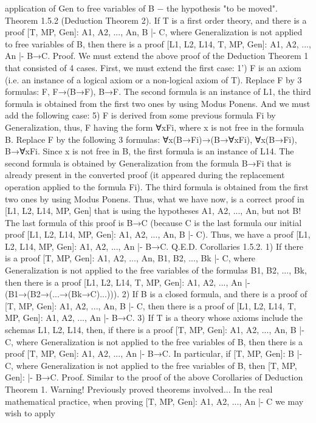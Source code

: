 application of Gen to free variables of B − the hypothesis "to be moved".
Theorem 1.5.2 (Deduction Theorem 2). If T is a first order theory, and there is a proof [T, MP, Gen]: A1,
A2, ..., An, B |- C, where Generalization is not applied to free variables of B, then there is a proof [L1, L2,
L14, T, MP, Gen]: A1, A2, ..., An |- B→C.
Proof. We must extend the above proof of the Deduction Theorem 1 that consisted of 4 cases. First, we
must extend the first case:
1') F is an axiom (i.e. an instance of a logical axiom or a non-logical axiom of T). Replace F by 3
formulas: F, F→(B→F), B→F. The second formula is an instance of L1, the third formula is obtained
from the first two ones by using Modus Ponens.
And we must add the following case:
5) F is derived from some previous formula Fi by Generalization, thus, F having the form ∀xFi, where x
is not free in the formula B. Replace F by the following 3 formulas:
∀x(B→Fi)→(B→∀xFi),
∀x(B→Fi),
B→∀xFi.
Since x is not free in B, the first formula is an instance of L14. The second formula is obtained by
Generalization from the formula B→Fi that is already present in the converted proof (it appeared during
the replacement operation applied to the formula Fi). The third formula is obtained from the first two ones
by using Modus Ponens.
Thus, what we have now, is a correct proof in [L1, L2, L14, MP, Gen] that is using the hypotheses A1,
A2, ..., An, but not B! The last formula of this proof is B→C (because C is the last formula our initial
proof [L1, L2, L14, MP, Gen]: A1, A2, ..., An, B |- C). Thus, we have a proof [L1, L2, L14, MP, Gen]: A1,
A2, ..., An |- B→C. Q.E.D.
Corollaries 1.5.2. 1) If there is a proof [T, MP, Gen]: A1, A2, ..., An, B1, B2, ..., Bk |- C, where
Generalization is not applied to the free variables of the formulas B1, B2, ..., Bk, then there is a proof [L1,
L2, L14, T, MP, Gen]: A1, A2, ..., An |- (B1→(B2→(...→(Bk→C)...))).
2) If B is a closed formula, and there is a proof of [T, MP, Gen]: A1, A2, ..., An, B |- C, then there is a
proof of [L1, L2, L14, T, MP, Gen]: A1, A2, ..., An |- B→C.
3) If T is a theory whose axioms include the schemas L1, L2, L14, then, if there is a proof [T, MP, Gen]:
A1, A2, ..., An, B |- C, where Generalization is not applied to the free variables of B, then there is a proof
[T, MP, Gen]: A1, A2, ..., An |- B→C. In particular, if [T, MP, Gen]: B |- C, where Generalization is not
applied to the free variables of B, then [T, MP, Gen]: |- B→C.
Proof. Similar to the proof of the above Corollaries of Deduction Theorem 1.
Warning! Previously proved theorems involved...
In the real mathematical practice, when proving [T, MP, Gen]: A1, A2, ..., An |- C we may wish to apply

